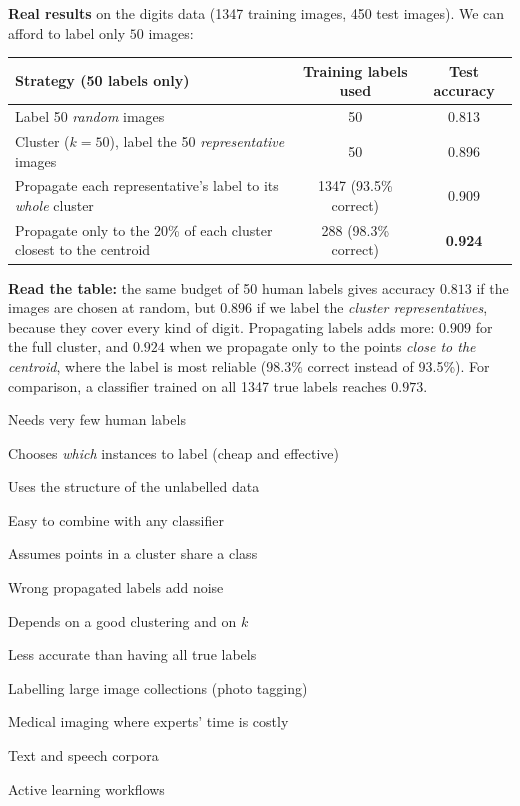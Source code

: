 \textbf{Real results} on the digits data (1347 training images, 450 test images). We can afford to label only $50$ images:

\begin{center}
\begin{tabular}{@{}p{8.2cm}cc@{}}
\toprule
\textbf{Strategy (50 labels only)} & \textbf{Training labels used} & \textbf{Test accuracy}\\
\midrule
Label 50 \emph{random} images & 50 & 0.813\\
Cluster ($k=50$), label the 50 \emph{representative} images & 50 & 0.896\\
Propagate each representative's label to its \emph{whole} cluster & 1347 (93.5\% correct) & 0.909\\
Propagate only to the 20\% of each cluster closest to the centroid & 288 (98.3\% correct) & \textbf{0.924}\\
\bottomrule
\end{tabular}
\end{center}

\noindent \textbf{Read the table:} the same budget of 50 human labels gives accuracy $0.813$ if the images are chosen at random, but $0.896$ if we label the \emph{cluster representatives}, because they cover every kind of digit. Propagating labels adds more: $0.909$ for the full cluster, and $0.924$ when we propagate only to the points \emph{close to the centroid}, where the label is most reliable (98.3\% correct instead of 93.5\%). For comparison, a classifier trained on all 1347 true labels reaches $0.973$.

{\item Needs very few human labels
 \item Chooses \emph{which} instances to label (cheap and effective)
 \item Uses the structure of the unlabelled data
 \item Easy to combine with any classifier}
{\item Assumes points in a cluster share a class
 \item Wrong propagated labels add noise
 \item Depends on a good clustering and on $k$
 \item Less accurate than having all true labels}
{\item Labelling large image collections (photo tagging)
 \item Medical imaging where experts' time is costly
 \item Text and speech corpora
 \item Active learning workflows}

